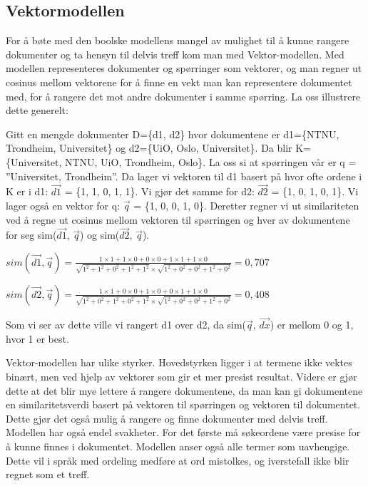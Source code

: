 \documentclass[]{article}
\begin{document}
\subsection{Vektormodellen}
For å bøte med den boolske modellens mangel av mulighet til å kunne rangere dokumenter og ta hensyn til delvis treff kom man med Vektor-modellen.  Med modellen representeres dokumenter og spørringer som vektorer, og man regner ut cosinus mellom vektorene for å finne en vekt man kan representere dokumentet med, for å rangere det mot andre dokumenter i samme spørring.  La oss illustrere dette generelt:

\vspace{5mm}

Gitt en mengde dokumenter D=\{d1, d2\} hvor dokumentene er d1=\{NTNU, Trondheim, Universitet\} og d2=\{UiO, Oslo, Universitet\}. Da blir K=\{Universitet, NTNU, UiO, Trondheim, Oslo\}. La oss  si at spørringen vår er q = ”Universitet, Trondheim”.  Da lager vi vektoren til d1 basert på hvor ofte ordene i K er i d1: $\vec{d1}$ = \{1, 1, 0, 1, 1\}. Vi gjør det samme for d2: $\vec{d2}$ = \{1, 0, 1, 0, 1\}. Vi lager også en vektor for q: $\vec{q}$ = \{1, 0, 0, 1, 0\}. Deretter regner vi ut similariteten ved å regne ut cosinus mellom vektoren til spørringen og hver av dokumentene for seg sim($\vec{d1}$, $\vec{q}$) og sim($\vec{d2}$, $\vec{q}$). 

\vspace{5mm}

$sim(\overrightarrow{d1}, \overrightarrow{q}) = \frac{1\times1+1\times0+0\times0+1\times1+1\times0}{\sqrt{1^2+1^2+0^2+1^2+1^2}\times\sqrt{1^2+0^2+0^2+1^2+0^2}} = 0,707$
\vspace{2mm}

$sim(\overrightarrow{d2}, \overrightarrow{q}) = \frac{1\times1+0\times0+1\times0+0\times1+1\times0}{\sqrt{1^2+0^2+1^2+0^2+1^2}\times\sqrt{1^2+0^2+0^2+1^2+0^2}} = 0,408$
\vspace{5mm}

Som vi ser av dette ville vi rangert d1 over d2, da sim($\vec{q}$, $\overrightarrow{dx}$) er mellom 0 og 1, hvor 1 er best. 

\vspace{5mm}

Vektor-modellen har ulike styrker. Hovedstyrken ligger i at termene ikke vektes binært, men ved hjelp av vektorer som gir et mer presist resultat. Videre er gjør dette at det blir mye lettere å rangere dokumentene, da man kan gi dokumentene en similaritetsverdi basert på vektoren til spørringen og vektoren til dokumentet. Dette gjør det også mulig å rangere og finne dokumenter med delvis treff. Modellen har også endel svakheter. For det første må søkeordene være presise for å kunne finnes i dokumentet. Modellen anser også alle termer som uavhengige. Dette vil i språk med ordeling medføre at ord mistolkes, og iverstefall ikke blir regnet som et treff. 
\end{document}
